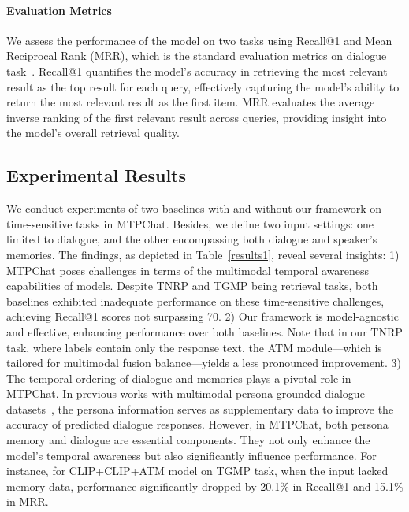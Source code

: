\paragraph{Evaluation Metrics}
We assess the performance of the model on two tasks using Recall@1 and Mean Reciprocal Rank (MRR), which is the standard evaluation metrics on dialogue task~\cite{lee2021constructing,feng2022mmdialog, ahn2023mpchat}. Recall@1 quantifies the model's accuracy in retrieving the most relevant result as the top result for each query, effectively capturing the model's ability to return the most relevant result as the first item. MRR evaluates the average inverse ranking of the first relevant result across queries, providing insight into the model's overall retrieval quality.

\subsection{Experimental Results}

We conduct experiments of two baselines with and without our framework on time-sensitive tasks in MTPChat. Besides, we define two input settings: one limited to dialogue, and the other encompassing both dialogue and speaker's memories. The findings, as depicted in Table~\ref{results1}, reveal several insights: 1) MTPChat poses challenges in terms of the multimodal temporal awareness capabilities of models. Despite TNRP and TGMP being retrieval tasks, both baselines exhibited inadequate performance on these time-sensitive challenges, achieving Recall@1 scores not surpassing 70. 2) Our framework is model-agnostic and effective, enhancing performance over both baselines. Note that in our TNRP task, where labels contain only the response text, the ATM module—which is tailored for multimodal fusion balance—yields a less pronounced improvement. 
3) The temporal ordering of dialogue and memories plays a pivotal role in MTPChat. In previous works with multimodal persona-grounded dialogue datasets~\cite{zhong2020towards,wen2021automatically}, the persona information serves as supplementary data to improve the accuracy of predicted dialogue responses. However, in MTPChat, both persona memory and dialogue are essential components. They not only enhance the model's temporal awareness but also significantly influence performance. For instance, for CLIP+CLIP+ATM model on TGMP task, when the input lacked memory data, performance significantly dropped by 20.1\% in Recall@1 and 15.1\% in MRR.



